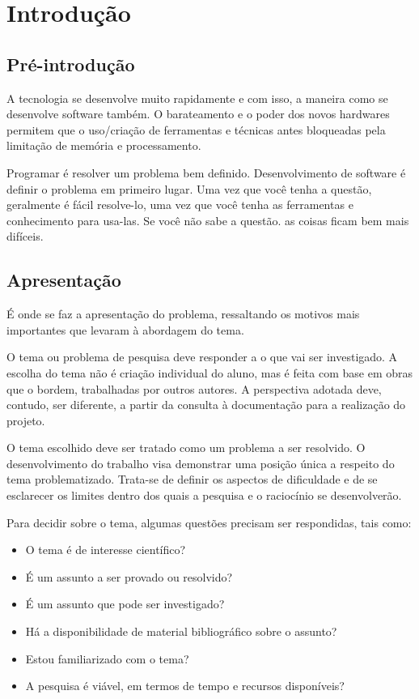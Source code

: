 \chapter{Introdução}

\section{Pré-introdução}

A tecnologia se desenvolve muito rapidamente e com isso, a maneira como se
desenvolve software também. O barateamento e o poder dos novos hardwares
permitem que o uso/criação de ferramentas e técnicas antes bloqueadas pela
limitação de memória e processamento.

Programar é resolver um problema bem definido. Desenvolvimento de software é
definir o problema em primeiro lugar. Uma vez que você tenha a questão,
geralmente é fácil resolve-lo, uma vez que você tenha as ferramentas e
conhecimento para usa-las. Se você não sabe a questão. as coisas ficam bem mais
difíceis. \cite{ProgrammingIsEasySoftwareDevelopmentIsHard}

\section{Apresentação}

É onde se faz a apresentação do problema, ressaltando os motivos mais
importantes que levaram à abordagem do tema.

O tema ou problema de pesquisa deve responder a o que vai ser investigado. A
escolha do tema não é criação individual do aluno, mas é feita com base em obras
que o bordem, trabalhadas por outros autores. A perspectiva adotada deve,
contudo, ser diferente, a partir da consulta à documentação para a realização do
projeto.

O tema escolhido deve ser tratado como um problema a ser resolvido. O
desenvolvimento do trabalho visa demonstrar uma posição única a respeito do tema
problematizado. Trata-se de definir os aspectos de dificuldade e de se
esclarecer os limites dentro dos quais a pesquisa e o raciocínio se
desenvolverão.

Para decidir sobre o tema, algumas questões precisam ser respondidas, tais como:

\begin{itemize}
    \item O tema é de interesse científico?
    \item É um assunto a ser provado ou resolvido?
    \item É um assunto que pode ser investigado?
    \item Há a disponibilidade de material bibliográfico sobre o assunto?
    \item Estou familiarizado com o tema?
    \item A pesquisa é viável, em termos de tempo e recursos disponíveis?
\end{itemize}

